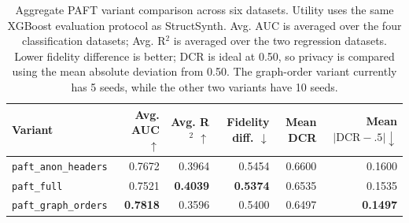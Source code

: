 
\begin{table}[t]
\centering
\small
\setlength{\tabcolsep}{4pt}
\begin{tabular}{lrrrrr}
\hline
Variant & Avg. AUC $\uparrow$ & Avg. R$^2$ $\uparrow$ & Fidelity diff. $\downarrow$ & Mean DCR & Mean $|\mathrm{DCR}-.5|\downarrow$ \\
\hline
\texttt{paft\_anon\_headers} & 0.7672 & 0.3964 & 0.5454 & 0.6600 & 0.1600 \\
\texttt{paft\_full} & 0.7521 & \textbf{0.4039} & \textbf{0.5374} & 0.6535 & 0.1535 \\
\texttt{paft\_graph\_orders} & \textbf{0.7818} & 0.3596 & 0.5400 & 0.6497 & \textbf{0.1497} \\
\hline
\end{tabular}
\caption{Aggregate PAFT variant comparison across six datasets. Utility uses the same XGBoost evaluation protocol as StructSynth. Avg. AUC is averaged over the four classification datasets; Avg. R$^2$ is averaged over the two regression datasets. Lower fidelity difference is better; DCR is ideal at 0.50, so privacy is compared using the mean absolute deviation from 0.50. The graph-order variant currently has 5 seeds, while the other two variants have 10 seeds.}
\label{tab:paft_variant_aggregate}
\end{table}

